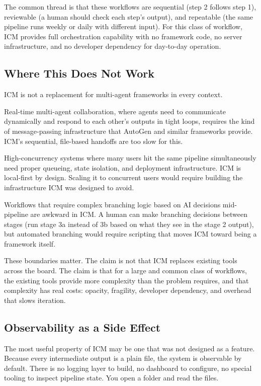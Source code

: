 \documentclass[acmlarge,nonacm,screen]{acmart}
\begin{document}
The common thread is that these workflows are sequential (step 2 follows step 1), reviewable (a human should check each step's output), and repeatable (the same pipeline runs weekly or daily with different input). For this class of workflow, ICM provides full orchestration capability with no framework code, no server infrastructure, and no developer dependency for day-to-day operation.

\subsection{Where This Does Not Work}

ICM is not a replacement for multi-agent frameworks in every context.

Real-time multi-agent collaboration, where agents need to communicate dynamically and respond to each other's outputs in tight loops, requires the kind of message-passing infrastructure that AutoGen \cite{wu2023autogen} and similar frameworks provide. ICM's sequential, file-based handoffs are too slow for this.

High-concurrency systems where many users hit the same pipeline simultaneously need proper queueing, state isolation, and deployment infrastructure. ICM is local-first by design. Scaling it to concurrent users would require building the infrastructure ICM was designed to avoid.

Workflows that require complex branching logic based on AI decisions mid-pipeline are awkward in ICM. A human can make branching decisions between stages (run stage 3a instead of 3b based on what they see in the stage 2 output), but automated branching would require scripting that moves ICM toward being a framework itself.

These boundaries matter. The claim is not that ICM replaces existing tools across the board. The claim is that for a large and common class of workflows, the existing tools provide more complexity than the problem requires, and that complexity has real costs: opacity, fragility, developer dependency, and overhead that slows iteration.

\subsection{Observability as a Side Effect}

The most useful property of ICM may be one that was not designed as a feature. Because every intermediate output is a plain file, the system is observable by default. There is no logging layer to build, no dashboard to configure, no special tooling to inspect pipeline state. You open a folder and read the files.
\end{document}
